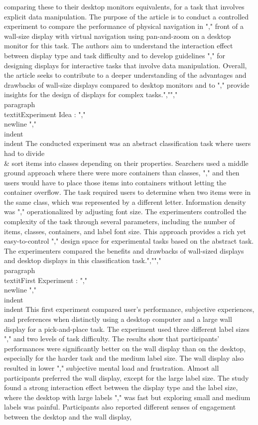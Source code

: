 comparing these to their desktop monitors  equivalents, for a task that involves explicit data manipulation. The purpose of the article is to conduct a controlled experiment to compare the performance of physical navigation in ","        front of a wall-size display with virtual navigation using pan-and-zoom on a desktop monitor for this task. The authors aim to understand the interaction effect between display type and task difficulty and to develop guidelines ","        for designing displays for interactive tasks that involve data manipulation. Overall, the article seeks to contribute to a deeper understanding of the advantages and drawbacks of wall-size displays compared to desktop monitors and to ","        provide insights for the design of displays for complex tasks.","","        \\paragraph{ \\textit{Experiment Idea :} ","                \\newline }","        \\indent \\indent The conducted experiment was an abstract classification task where users had to divide \\& sort items into classes depending on their properties. Searchers used a middle ground approach where there were more containers than classes, ","        and then users would have to place those items into containers without letting the container overflow. The task required users to determine when two items were in the same class, which was represented by a different letter. Information density was ","        operationalized by adjusting font size. The experimenters controlled the complexity of the task through several parameters, including the number of items, classes, containers, and label font size. This approach provides a rich yet easy-to-control ","        design space for experimental tasks based on the abstract task. The experimenters compared the benefits and drawbacks of wall-sized displays and desktop displays in this classification task.","","        \\paragraph{ \\textit{First Experiment :} ","                \\newline }","        \\indent \\indent This first experiment compared user's performance, subjective experiences, and preferences when distinctly using a desktop computer and a large wall display for a pick-and-place task. The experiment used three different label sizes ","        and two levels of task difficulty. The results show that participants' performances were significantly better on the wall display than on the desktop, especially for the harder task and the medium label size. The wall display also resulted in lower ","        subjective mental load and frustration. Almost all participants preferred the wall display, except for the large label size. The study found a strong interaction effect between the display type and the label size, where the desktop with large labels ","        was fast but exploring small and medium labels was painful. Participants also reported different senses of engagement between the desktop and the wall display, 